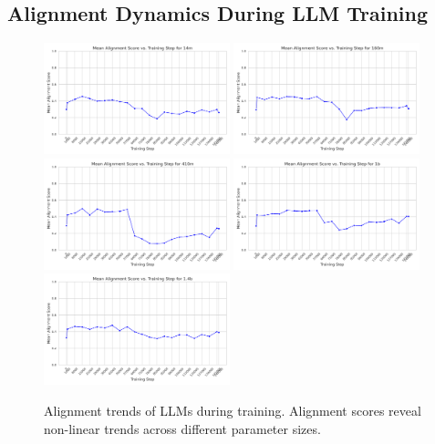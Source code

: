 \documentclass[10pt,a4paper]{article}
\begin{document}
\subsection{Alignment Dynamics During LLM Training}
\begin{figure}[H]
    \centering
    \includegraphics[width=0.48\textwidth]{mean_alignment_score_14m.png}
    \includegraphics[width=0.48\textwidth]{mean_alignment_score_160m.png}
    \includegraphics[width=0.48\textwidth]{mean_alignment_score_410m.png}
    \includegraphics[width=0.48\textwidth]{mean_alignment_score_1b.png}
    \includegraphics[width=0.48\textwidth]{mean_alignment_score_1.4b.png}
    \caption{Alignment trends of LLMs during training. Alignment scores reveal non-linear trends across different parameter sizes.}
    \label{fig:llm_training_alignment}
\end{figure}
\end{document}
